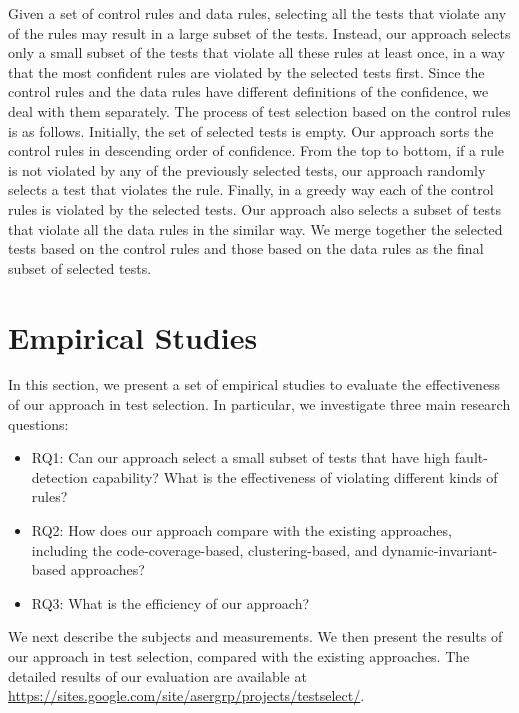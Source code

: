 \documentclass{sig-alternate}
\begin{document}
Given a set of control rules and data rules, selecting all the tests
that violate any of the rules may result in a large subset of the
tests. Instead, our approach selects only a small subset of the
tests that violate all these rules at least once, in a way that the
most confident rules are violated by the selected tests first. Since
the control rules and the data rules have different definitions of
the confidence, we deal with them separately. The process of test
selection based on the control rules is as follows. Initially, the
set of selected tests is empty. Our approach sorts the control rules
in descending order of confidence. From the top to bottom, if a rule
is not violated by any of the previously selected tests, our
approach randomly selects a test that violates the rule. Finally, in
a greedy way each of the control rules is violated by the selected
tests. Our approach also selects a subset of tests that violate all
the data rules in the similar way. We merge together the selected
tests based on the control rules and those based on the data rules
as the final subset of selected tests.







\section{Empirical Studies} \label{sec:studies}

In this section, we present a set of empirical studies to evaluate
the effectiveness of our approach in test selection. In particular,
we investigate three main research questions:
\begin{itemize}
\item
RQ1: Can our approach select a small subset of tests that have high
fault-detection capability? What is the effectiveness of violating
different kinds of rules?
\item
RQ2: How does our approach compare with the existing approaches,
including the code-coverage-based, clustering-based, and
dynamic-invariant-based approaches?


\item
RQ3: What is the efficiency of our approach?


\end{itemize}


We next describe the subjects and measurements. We then present the
results of our approach in test selection, compared with the
existing approaches. The detailed results of our evaluation are
available at
\url{https://sites.google.com/site/asergrp/projects/testselect/}.
\end{document}
